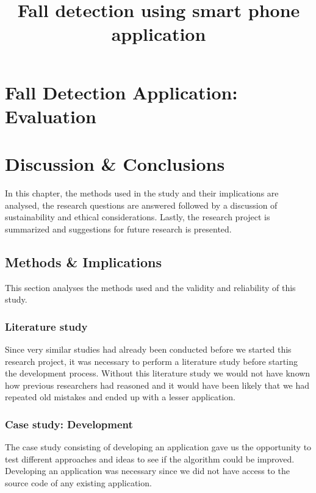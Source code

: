 \documentclass[12pt, a4paper, onecolumn]{article}
\begin{document}
	
	\title{Fall detection using smart phone application}
	\maketitle
	
	\tableofcontents
	
	\newpage
	
	\section{Fall Detection Application: Evaluation}
	\newpage
	
	\section{Discussion \& Conclusions}
	
	In this chapter, the methods used in the study and their implications are analysed, the research questions are answered followed by a discussion of sustainability and ethical considerations. Lastly, the research project is summarized and suggestions for future research is presented.
	
	\subsection{Methods \& Implications}
	
	This section analyses the methods used and the validity and reliability of this study.
	
	\subsubsection{Literature study}
	
	Since very similar studies had already been conducted before we started this research project, it was necessary to perform a literature study before starting the development process. Without this literature study we would not have known how previous researchers had reasoned and it would have been likely that we had repeated old mistakes and ended up with a lesser application.
	
	\subsubsection{Case study: Development}
	
	The case study consisting of developing an application gave us the opportunity to test different approaches and ideas to see if the algorithm could be improved. Developing an application was necessary since we did not have access to the source code of any existing application.
	
\end{document}
